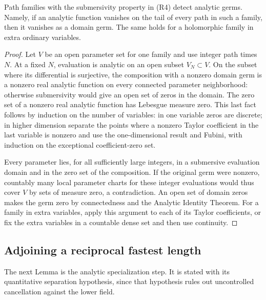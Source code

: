 \begin{lemma}\label{path:detection}
Path families with the submersivity property in \textup{(R4)} detect
analytic germs.  Namely, if an analytic function vanishes on the tail
of every path in such a family, then it vanishes as a domain germ.
The same holds for a holomorphic family in extra ordinary variables.
\end{lemma}
\begin{proof}
Let \(V\) be an open parameter set for one family and use integer path
times \(N\).  At a fixed \(N\), evaluation is analytic on an open
subset \(V_N\subset V\).  On the subset where its differential is
surjective, the composition with a nonzero domain germ is a nonzero
real analytic function on every connected parameter neighborhood:
otherwise submersivity would give an open set of zeros in the domain.
The zero set of a nonzero real analytic function has Lebesgue measure
zero.  This last fact follows by induction on the number of variables:
in one variable zeros are discrete; in higher dimension separate the
points where a nonzero Taylor coefficient in the last variable is
nonzero and use the one-dimensional result and Fubini, with induction
on the exceptional coefficient-zero set.

Every parameter lies, for all sufficiently large integers, in a
submersive evaluation domain and in the zero set of the composition.
If the original germ were nonzero, countably many local parameter
charts for these integer evaluations would thus cover \(V\) by sets
of measure zero, a contradiction.  An open set of domain zeros makes
the germ zero by connectedness and the Analytic Identity Theorem.
For a family in extra variables, apply this argument to each of its
Taylor coefficients, or fix the extra variables in a countable dense
set and then use continuity.
\end{proof}

\subsection{Adjoining a reciprocal fastest length}

The next Lemma is the analytic specialization step.  It is stated with
its quantitative separation hypothesis, since that hypothesis rules out
uncontrolled cancellation against the lower field.

